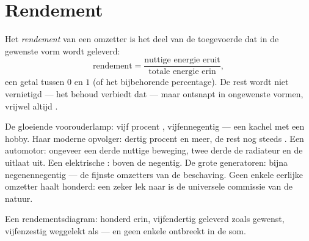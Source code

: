 \section{Rendement}

\begin{definition}[Rendement]\label{def:g9:energy-conversions:efficiency}
Het \emph{rendement} van een omzetter is het deel van
de toegevoerde  dat in de gewenste vorm wordt geleverd:
\[
\text{rendement} =
\frac{\text{nuttige energie eruit}}{\text{totale energie erin}},
\]
een getal tussen $0$ en $1$ (of het bijbehorende percentage). De rest
wordt niet vernietigd --- het behoud verbiedt dat --- maar ontsnapt in
ongewenste vormen, vrijwel altijd .
\end{definition}

\begin{example}[Rapportcijfers]\label{ex:g9:energy-conversions:reportcards}
De gloeiende voorouderlamp: vijf procent ,
vijfennegentig  --- een kachel met een hobby. Haar moderne
opvolger: dertig procent en meer, de rest nog steeds . Een
automotor: ongeveer een derde nuttige beweging, twee derde de radiateur
en de uitlaat uit. Een elektrische : boven de negentig. De
grote generatoren: bijna negenennegentig --- de fijnste omzetters
van de beschaving. Geen enkele eerlijke omzetter haalt honderd: een
zeker lek naar  is de universele commissie van de natuur.
\end{example}

\begin{omfigure}

{\small Een rendementsdiagram: honderd  erin,
vijfendertig geleverd zoals gewenst, vijfenzestig weggelekt als 
--- en geen enkele  ontbreekt in de som.}
\end{omfigure}

